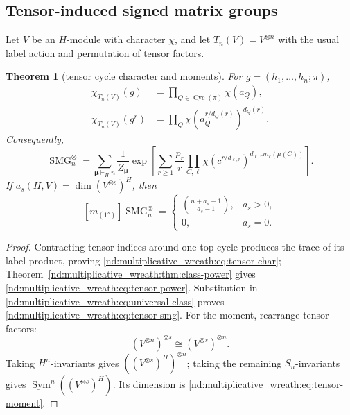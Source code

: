 \documentclass[10pt]{article}
\newcommand{\Sym}{\operatorname{Sym}}
\newcommand{\SMG}{\operatorname{SMG}}
\newcommand{\MGF}{\SMG}
\newcommand{\Cyc}{\operatorname{Cyc}}
\newtheorem{theorem}{Theorem}
\begin{document}
\subsection{Tensor-induced signed matrix groups}

Let $V$ be an $H$-module with character $\chi$, and let
$T_n(V)=V^{\otimes n}$ with the usual label action and permutation of tensor
factors.

\begin{theorem}[tensor cycle character and moments]\label{nd:multiplicative_wreath:thm:tensor}
For $g=(h_1,\ldots,h_n;\pi)$,
\begin{align}
 \chi_{T_n(V)}(g)&=\prod_{Q\in\Cyc(\pi)}\chi(a_Q),\label{nd:multiplicative_wreath:eq:tensor-char}\\
 \chi_{T_n(V)}(g^r)&=\prod_Q
 \chi(a_Q^{r/d_Q(r)})^{d_Q(r)}.\label{nd:multiplicative_wreath:eq:tensor-power}
\end{align}
Consequently,
\begin{equation}\label{nd:multiplicative_wreath:eq:tensor-smg}
 \boxed{\MGF_n^\otimes=
 \sum_{\boldsymbol\mu\vdash_Hn}\frac1{Z_{\boldsymbol\mu}}
 \exp\!\left[\sum_{r\ge1}\frac{p_r}{r}
 \prod_{C,\ell}\chi(c^{r/d_{\ell,r}})^{
 d_{\ell,r}m_\ell(\mu(C))}\right].}
\end{equation}
If $a_s(H,V)=\dim(V^{\otimes s})^H$, then
\begin{equation}\label{nd:multiplicative_wreath:eq:tensor-moment}
 \boxed{[m_{(1^s)}]\MGF_n^\otimes=
 \begin{cases}
 \binom{n+a_s-1}{a_s-1},&a_s>0,\\
 0,&a_s=0.
 \end{cases}}
\end{equation}
\end{theorem}

\begin{proof}
Contracting tensor indices around one top cycle produces the trace of its
label product, proving \eqref{nd:multiplicative_wreath:eq:tensor-char}; Theorem~\ref{nd:multiplicative_wreath:thm:class-power}
gives \eqref{nd:multiplicative_wreath:eq:tensor-power}.  Substitution in
\eqref{nd:multiplicative_wreath:eq:universal-class} proves \eqref{nd:multiplicative_wreath:eq:tensor-smg}.  For the moment,
rearrange tensor factors:
\[
 (V^{\otimes n})^{\otimes s}\cong(V^{\otimes s})^{\otimes n}.
\]
Taking $H^n$-invariants gives $((V^{\otimes s})^H)^{\otimes n}$; taking the
remaining $S_n$-invariants gives
$\Sym^n((V^{\otimes s})^H)$.  Its dimension is
\eqref{nd:multiplicative_wreath:eq:tensor-moment}.
\end{proof}
\end{document}
